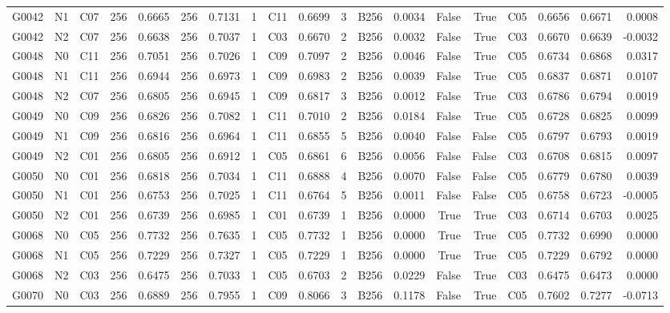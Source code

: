 \begin{tabular}{lllrrrrrlrrlrrrlrrr}
G0042 & N1 & C07 & 256 & 0.6665 & 256 & 0.7131 & 1 & C11 & 0.6699 & 3 & B256 & 0.0034 & False & True & C05 & 0.6656 & 0.6671 & 0.0008 \\
G0042 & N2 & C07 & 256 & 0.6638 & 256 & 0.7037 & 1 & C03 & 0.6670 & 2 & B256 & 0.0032 & False & True & C03 & 0.6670 & 0.6639 & -0.0032 \\
G0048 & N0 & C11 & 256 & 0.7051 & 256 & 0.7026 & 1 & C09 & 0.7097 & 2 & B256 & 0.0046 & False & True & C05 & 0.6734 & 0.6868 & 0.0317 \\
G0048 & N1 & C11 & 256 & 0.6944 & 256 & 0.6973 & 1 & C09 & 0.6983 & 2 & B256 & 0.0039 & False & True & C05 & 0.6837 & 0.6871 & 0.0107 \\
G0048 & N2 & C07 & 256 & 0.6805 & 256 & 0.6945 & 1 & C09 & 0.6817 & 3 & B256 & 0.0012 & False & True & C03 & 0.6786 & 0.6794 & 0.0019 \\
G0049 & N0 & C09 & 256 & 0.6826 & 256 & 0.7082 & 1 & C11 & 0.7010 & 2 & B256 & 0.0184 & False & True & C05 & 0.6728 & 0.6825 & 0.0099 \\
G0049 & N1 & C09 & 256 & 0.6816 & 256 & 0.6964 & 1 & C11 & 0.6855 & 5 & B256 & 0.0040 & False & False & C05 & 0.6797 & 0.6793 & 0.0019 \\
G0049 & N2 & C01 & 256 & 0.6805 & 256 & 0.6912 & 1 & C05 & 0.6861 & 6 & B256 & 0.0056 & False & False & C03 & 0.6708 & 0.6815 & 0.0097 \\
G0050 & N0 & C01 & 256 & 0.6818 & 256 & 0.7034 & 1 & C11 & 0.6888 & 4 & B256 & 0.0070 & False & False & C05 & 0.6779 & 0.6780 & 0.0039 \\
G0050 & N1 & C01 & 256 & 0.6753 & 256 & 0.7025 & 1 & C11 & 0.6764 & 5 & B256 & 0.0011 & False & False & C05 & 0.6758 & 0.6723 & -0.0005 \\
G0050 & N2 & C01 & 256 & 0.6739 & 256 & 0.6985 & 1 & C01 & 0.6739 & 1 & B256 & 0.0000 & True & True & C03 & 0.6714 & 0.6703 & 0.0025 \\
G0068 & N0 & C05 & 256 & 0.7732 & 256 & 0.7635 & 1 & C05 & 0.7732 & 1 & B256 & 0.0000 & True & True & C05 & 0.7732 & 0.6990 & 0.0000 \\
G0068 & N1 & C05 & 256 & 0.7229 & 256 & 0.7327 & 1 & C05 & 0.7229 & 1 & B256 & 0.0000 & True & True & C05 & 0.7229 & 0.6792 & 0.0000 \\
G0068 & N2 & C03 & 256 & 0.6475 & 256 & 0.7033 & 1 & C05 & 0.6703 & 2 & B256 & 0.0229 & False & True & C03 & 0.6475 & 0.6473 & 0.0000 \\
G0070 & N0 & C03 & 256 & 0.6889 & 256 & 0.7955 & 1 & C09 & 0.8066 & 3 & B256 & 0.1178 & False & True & C05 & 0.7602 & 0.7277 & -0.0713 \\

\end{tabular}
